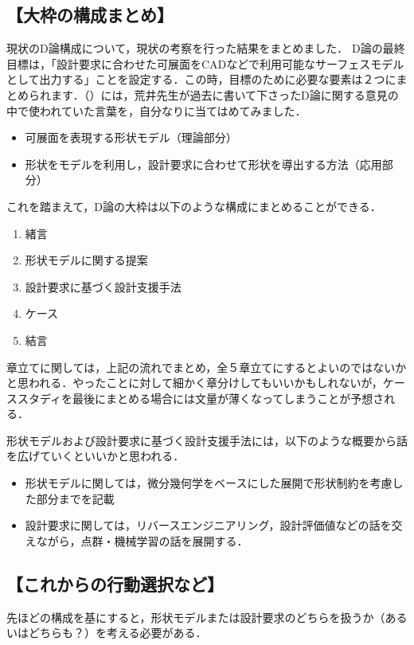 \documentclass[16pt]{jsarticle}
\begin{document}
		\subsection*{【大枠の構成まとめ】}
		現状のD論構成について，現状の考察を行った結果をまとめました．	D論の最終目標は，「設計要求に合わせた可展面をCADなどで利用可能なサーフェスモデルとして出力する」ことを設定する．この時，目標のために必要な要素は２つにまとめられます．（）には，荒井先生が過去に書いて下さったD論に関する意見の中で使われていた言葉を，自分なりに当てはめてみました．
		\begin{itemize}
			\item 可展面を表現する形状モデル（理論部分）
			\item 形状をモデルを利用し，設計要求に合わせて形状を導出する方法（応用部分）
		\end{itemize}
		これを踏まえて，D論の大枠は以下のような構成にまとめることができる．
		\begin{enumerate}
			\item 緒言
			\item 形状モデルに関する提案
			\item 設計要求に基づく設計支援手法
			\item ケース
			\item 結言
		\end{enumerate}
		章立てに関しては，上記の流れでまとめ，全５章立てにするとよいのではないかと思われる．やったことに対して細かく章分けしてもいいかもしれないが，ケーススタディを最後にまとめる場合には文量が薄くなってしまうことが予想される．
		
		形状モデルおよび設計要求に基づく設計支援手法には，以下のような概要から話を広げていくといいかと思われる．
		\begin{itemize}
			\item 形状モデルに関しては，微分幾何学をベースにした展開で形状制約を考慮した部分までを記載
			\item 設計要求に関しては，リバースエンジニアリング，設計評価値などの話を交えながら，点群・機械学習の話を展開する．
		\end{itemize}
		\subsection*{【これからの行動選択など】}
			先ほどの構成を基にすると，形状モデルまたは設計要求のどちらを扱うか（あるいはどちらも？）を考える必要がある．
			
\end{document}
